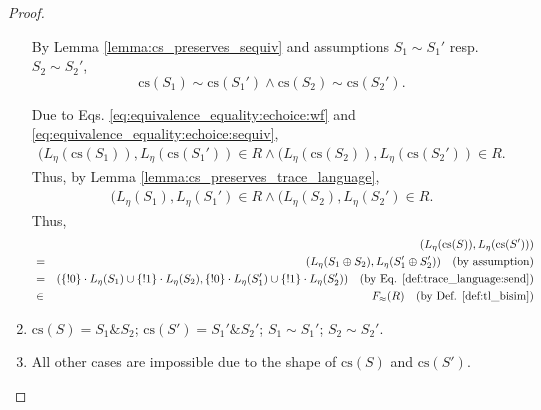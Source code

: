 \documentclass{llncs}
\newcommand*{\bisim}{\approx}
\newcommand*{\cs}{\mathrm{cs}}
\newcommand*{\sequiv}{\sim}
\newcommand*{\send}{\mathord{!}}
\newcommand*{\echoice}{\oplus}
\newcommand*{\ichoice}{\mathop{\&}}
\newcommand*{\concat}{\cdot}
\renewcommand*{\|}{\;|\;}
\begin{document}
\begin{proof}
\begin{enumerate}
      By Lemma \ref{lemma:cs_preserves_sequiv} and assumptions
      $S_1 \sequiv S_1'$ resp. $S_2 \sequiv S_2'$,
      \begin{equation}
        \label{eq:equivalence_equality:echoice:sequiv}
        \cs(S_1) \sequiv \cs(S_1') \land \cs(S_2) \sequiv \cs(S_2').
      \end{equation}

      Due to Eqs. \ref{eq:equivalence_equality:echoice:wf} and
      \ref{eq:equivalence_equality:echoice:sequiv},
      \begin{eqnarray*}
        (L_\eta(\cs(S_1)), L_\eta(\cs(S_1')) \in R \land
        (L_\eta(\cs(S_2)), L_\eta(\cs(S_2')) \in R.
      \end{eqnarray*}
      Thus, by Lemma \ref{lemma:cs_preserves_trace_language},
      \begin{eqnarray*}
        (L_\eta(S_1), L_\eta(S_1') \in R \land
        (L_\eta(S_2), L_\eta(S_2') \in R.
      \end{eqnarray*}
      Thus,
      \begin{eqnarray*}
        &&  (L_\eta(\cs(S)), L_\eta(\cs(S'))) \\
        &=& (L_\eta(S_1 \echoice S_2), L_\eta(S_1' \echoice S_2'))
        \quad \text{(by assumption)} \\
        &=& (\{\send 0\} \concat L_\eta(S_1) \cup \{\send 1\} \concat L_\eta(S_2),
            \{\send 0\} \concat L_\eta(S_1') \cup \{\send 1\} \concat L_\eta(S_2'))
        \quad \text{(by Eq. \ref{def:trace_language:send})} \\
        &\in& F_\bisim(R)
        \quad \text{(by Def. \ref{def:tl_bisim})}
      \end{eqnarray*}

    \item
      \label{case:equivalence_equality:ichoice}
      $\cs(S) = S_1 \ichoice S_2$; $\cs(S') = S_1' \ichoice S_2'$;
      $S_1 \sequiv S_1'$; $S_2 \sequiv S_2'$.

    \item
      All other cases are impossible due to the shape of $\cs(S)$ and
      $\cs(S')$.
  \end{enumerate}


\end{proof}
\end{document}
